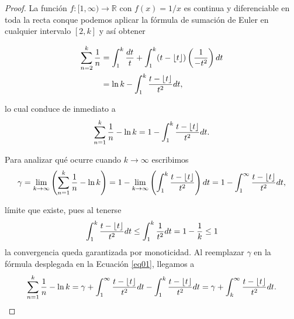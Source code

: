 \documentclass[10pt]{article}
\DeclarePairedDelimiter\floor{\lfloor}{\rfloor}
\theoremstyle{definition}
\theoremstyle{remark}
\newcommand{\BR}{\mathbb R}
\begin{document}
\begin{proof}
La funci\'on $f : [1, \infty) \to \BR$ con $f(x)=1/x$ es continua y diferenciable en toda la recta  
conque podemos aplicar la f\'ormula de sumaci\'on de Euler en cualquier intervalo $[2, k]$ 
y as\'i obtener 

\begin{align}
\sum_{n = 2}^k \frac{1}{n} &= \int_1^k \frac{dt}{t} + \int_{1}^k (t - \floor{t})\left(\frac{1}{-t^2}\right) dt \\
&= \ln k - \int_1^k \frac{t - \floor{t}}{t^2} dt,
\end{align} 

lo cual conduce de inmediato a 
\begin{align}
\sum_{n = 1}^k \frac{1}{n} - \ln k = 1 - \int_1^k \frac{t - \floor{t}}{t^2} dt.\label{eq01}
\end{align}

Para analizar qu\'e ocurre cuando $k \to \infty$ escribimos
\begin{align}
\gamma = \lim_{k \to \infty} \left(\sum_{n = 1}^k \frac{1}{n} - \ln k\right) 
= 1- \lim_{k \to \infty}  \left(\int_1^k \frac{t - \floor{t}}{t^2}\right) dt 
=  1- \int_1^\infty \frac{t - \floor{t}}{t^2} dt,
\end{align}

l\'imite que existe, pues al tenerse 
\begin{align}
\int_1^k \frac{t - \floor{t}}{t^2} dt  \le \int_1^k \frac{1}{t^2} dt 
= 1 -\frac{1}{k}   \le 1
\end{align}
la convergencia queda garantizada por monoticidad. 
Al reemplazar $\gamma$ en la f\'ormula desplegada en la Ecuaci\'on \ref{eq01}, llegamos a 
\begin{align}
\sum_{n = 1}^k \frac{1}{n} - \ln k = \gamma + \int_1^\infty \frac{t - \floor{t}}{t^2} dt - \int_1^k \frac{t - \floor{t}}{t^2} dt = 
 \gamma  +  \int_k^\infty \frac{t - \floor{t}}{t^2} dt.
\end{align}


\end{proof}
\end{document}
